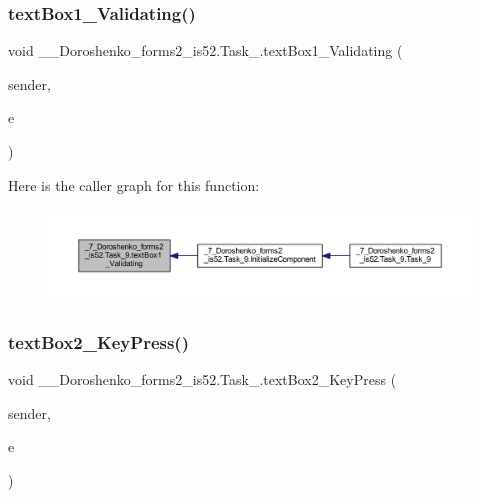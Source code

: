 \subsubsection{\texorpdfstring{text\+Box1\+\_\+\+Validating()}{textBox1\_Validating()}}
{\footnotesize\ttfamily void \+\_\+\_\+\+Doroshenko\+\_\+forms2\+\_\+is52.\+Task\+\_.\+text\+Box1\+\_\+\+Validating (\begin{DoxyParamCaption}\item[{object}]{sender,  }\item[{Cancel\+Event\+Args}]{e }\end{DoxyParamCaption})\hspace{0.3cm}{\ttfamily [private]}}

Here is the caller graph for this function\+:
\nopagebreak
\begin{figure}[H]
\begin{center}
\leavevmode
\includegraphics[width=350pt]{class__7___doroshenko__forms2__is52_1_1_task__9_afb796d1d759b3394c04953f05fea6a2d_icgraph}
\end{center}
\end{figure}
\hypertarget{class__7___doroshenko__forms2__is52_1_1_task__9_a2e680b59861c94a70411eeb3082e2f49}{}\label{class__7___doroshenko__forms2__is52_1_1_task__9_a2e680b59861c94a70411eeb3082e2f49} 
\subsubsection{\texorpdfstring{text\+Box2\+\_\+\+Key\+Press()}{textBox2\_KeyPress()}}
{\footnotesize\ttfamily void \+\_\+\_\+\+Doroshenko\+\_\+forms2\+\_\+is52.\+Task\+\_.\+text\+Box2\+\_\+\+Key\+Press (\begin{DoxyParamCaption}\item[{object}]{sender,  }\item[{Key\+Press\+Event\+Args}]{e }\end{DoxyParamCaption})\hspace{0.3cm}{\ttfamily [private]}}

